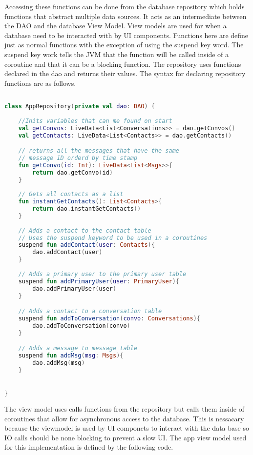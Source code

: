 \documentclass[../main/main.tex]{subfiles}
\begin{document}
Accessing these functions can be done from the database repository which holds functions that abstract multiple data sources.
It acts as an intermediate between the DAO and the database View Model. 
View models are used for when a database need to be interacted with by UI components. 
Functions here are define just as normal functions with the exception of using the suspend key word. 
The suspend key work tells the JVM that the function will be called inside of a coroutine and that it can be a blocking function. 
The repository uses functions declared in the dao and returns their values. 
The syntax for declaring repository functions are as follows. 

\begin{lstlisting}[caption={Example of repository definition.}, label={lst:example3}, language=Kotlin]

class AppRepository(private val dao: DAO) {
    
    //Inits variables that can me found on start
    val getConvos: LiveData<List<Conversations>> = dao.getConvos()
    val getContacts: LiveData<List<Contacts>> = dao.getContacts()

    // returns all the messages that have the same 
    // message ID orderd by time stamp
    fun getConvo(id: Int): LiveData<List<Msgs>>{
        return dao.getConvo(id)
    }
    
    // Gets all contacts as a list
    fun instantGetContacts(): List<Contacts>{
        return dao.instantGetContacts()
    }
    
    // Adds a contact to the contact table
    // Uses the suspend keyword to be used in a coroutines
    suspend fun addContact(user: Contacts){
        dao.addContact(user)
    }
    
    // Adds a primary user to the primary user table
    suspend fun addPrimaryUser(user: PrimaryUser){
        dao.addPrimaryUser(user)
    }

    // Adds a contact to a conversation table
    suspend fun addToConversation(convo: Conversations){
        dao.addToConversation(convo)
    }

    // Adds a message to message table
    suspend fun addMsg(msg: Msgs){
        dao.addMsg(msg)
    }


}
\end{lstlisting}

The view model uses calls functions from the repository but calls them inside of coroutines that allow for asynchronous access to the database. 
This is nessacary because the viewmodel is used by UI componets to interact with the data base so IO calls should be none blocking to prevent a slow UI.
The app view model used for this implementation is defined by the following code.
\end{document}
